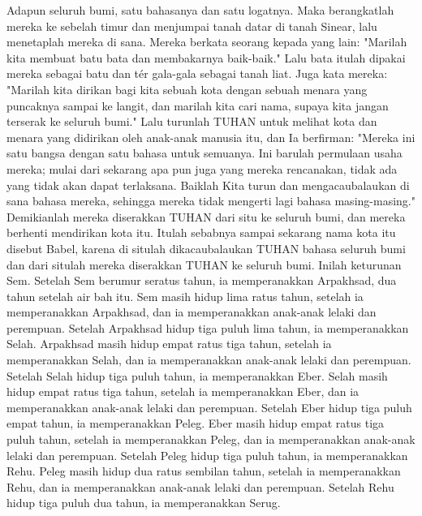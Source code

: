 \begin{biblechapter} %
 Adapun seluruh bumi, satu bahasanya dan satu logatnya.
\verse Maka berangkatlah mereka ke sebelah timur dan menjumpai tanah datar di tanah Sinear, lalu menetaplah mereka di sana.
\verse Mereka berkata seorang kepada yang lain: "Marilah kita membuat batu bata dan membakarnya baik-baik." Lalu bata itulah dipakai mereka sebagai batu dan tér gala-gala sebagai tanah liat.
\verse Juga kata mereka: "Marilah kita dirikan bagi kita sebuah kota dengan sebuah menara yang puncaknya sampai ke langit, dan marilah kita cari nama, supaya kita jangan terserak ke seluruh bumi."
\verse Lalu turunlah TUHAN untuk melihat kota dan menara yang didirikan oleh anak-anak manusia itu,
\verse dan Ia berfirman: "Mereka ini satu bangsa dengan satu bahasa untuk semuanya. Ini barulah permulaan usaha mereka; mulai dari sekarang apa pun juga yang mereka rencanakan, tidak ada yang tidak akan dapat terlaksana.
\verse Baiklah Kita turun dan mengacaubalaukan di sana bahasa mereka, sehingga mereka tidak mengerti lagi bahasa masing-masing."
\verse Demikianlah mereka diserakkan TUHAN dari situ ke seluruh bumi, dan mereka berhenti mendirikan kota itu.
\verse Itulah sebabnya sampai sekarang nama kota itu disebut Babel, karena di situlah dikacaubalaukan TUHAN bahasa seluruh bumi dan dari situlah mereka diserakkan TUHAN ke seluruh bumi.
 Inilah keturunan Sem. Setelah Sem berumur seratus tahun, ia memperanakkan Arpakhsad, dua tahun setelah air bah itu.
\verse Sem masih hidup lima ratus tahun, setelah ia memperanakkan Arpakhsad, dan ia memperanakkan anak-anak lelaki dan perempuan.
\verse Setelah Arpakhsad hidup tiga puluh lima tahun, ia memperanakkan Selah.
\verse Arpakhsad masih hidup empat ratus tiga tahun, setelah ia memperanakkan Selah, dan ia memperanakkan anak-anak lelaki dan perempuan.
\verse Setelah Selah hidup tiga puluh tahun, ia memperanakkan Eber.
\verse Selah masih hidup empat ratus tiga tahun, setelah ia memperanakkan Eber, dan ia memperanakkan anak-anak lelaki dan perempuan.
\verse Setelah Eber hidup tiga puluh empat tahun, ia memperanakkan Peleg.
\verse Eber masih hidup empat ratus tiga puluh tahun, setelah ia memperanakkan Peleg, dan ia memperanakkan anak-anak lelaki dan perempuan.
\verse Setelah Peleg hidup tiga puluh tahun, ia memperanakkan Rehu.
\verse Peleg masih hidup dua ratus sembilan tahun, setelah ia memperanakkan Rehu, dan ia memperanakkan anak-anak lelaki dan perempuan.
\verse Setelah Rehu hidup tiga puluh dua tahun, ia memperanakkan Serug.

\end{biblechapter}
